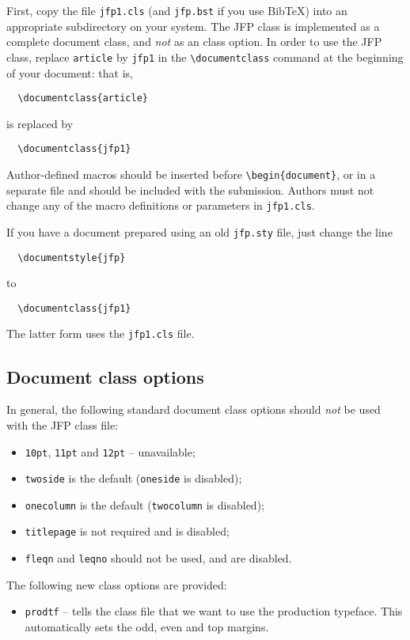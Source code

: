\documentclass{jfp1}
\begin{document}
First, copy the file \verb"jfp1.cls" (and \verb"jfp.bst" if you use Bib\TeX)
into an appropriate subdirectory on your system. The JFP class is implemented
as a complete document class, and \emph{not} as an class option.
In order to use the JFP class, replace \verb"article" by \verb"jfp1" in the
\verb"\documentclass" command at the beginning of your document: that is,

\begin{verbatim}
  \documentclass{article}
\end{verbatim}
%
is replaced by
%
\begin{verbatim}
  \documentclass{jfp1}
\end{verbatim}
%
Author-defined macros should be inserted before \verb"\begin{document}",
or in a separate file and should be included with the submission.
Authors must not change any of the macro definitions or parameters
in \verb"jfp1.cls".

If you have a document prepared using an old \verb"jfp.sty" file,
just change the line
\begin{verbatim}
  \documentstyle{jfp}
\end{verbatim}
to
\begin{verbatim}
  \documentclass{jfp1}
\end{verbatim}
The latter form uses the \verb"jfp1.cls" file.

\subsection{Document class options}\label{sec:ClassOp}

In general, the following standard document class options should \emph{not} be
used with the JFP class file:
%
\begin{itemize}
  \item \texttt{10pt}, \texttt{11pt} and \texttt{12pt} -- unavailable;
  \item \texttt{twoside} is the default (\texttt{oneside} is disabled);
  \item \texttt{onecolumn} is the default (\texttt{twocolumn} is disabled);
  \item \texttt{titlepage} is not required and is disabled;
  \item \texttt{fleqn} and \texttt{leqno} should not be used, and are disabled.
\end{itemize}
%
\ifprodtf
The following new class options are provided:
\begin{itemize}
  \item \texttt{prodtf} -- tells the class file that we want to use the
    production typeface. This automatically sets the odd, even and top
    margins.
\end{itemize}
\fi
\end{document}
